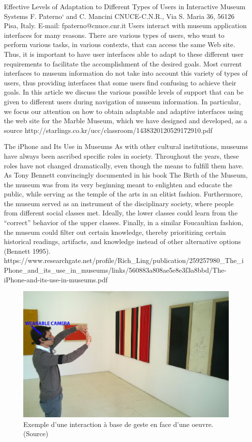 Effective Levels of Adaptation to Different Types
of Users in Interactive Museum Systems
F. Paterno` and C. Mancini
CNUCE-C.N.R., Via S. Maria 36, 56126 Pisa, Italy. E-mail: fpaterno@cnuce.cnr.it
Users interact with museum application interfaces for
many reasons. There are various types of users, who
want to perform various tasks, in various contexts, that
can access the same Web site. Thus, it is important to
have user interfaces able to adapt to these different user
requirements to facilitate the accomplishment of the
desired goals. Most current interfaces to museum information
do not take into account this variety of types of
users, thus providing interfaces that some users find
confusing to achieve their goals. In this article we discuss
the various possible levels of support that can be
given to different users during navigation of museum
information. In particular, we focus our attention on how
to obtain adaptable and adaptive interfaces using the
web site for the Marble Museum, which we have designed
and developed, as a source
http://starlings.co.kr/ucc/classroom/1438320120529172910.pdf



The iPhone and Its Use in Museums
As with other cultural institutions, museums have always
been ascribed specific roles in society. Throughout the years,
these roles have not changed dramatically, even though the
means to fulfill them have. As Tony Bennett convincingly
documented in his book The Birth of the Museum, the museum
was from its very beginning meant to enlighten and educate
the public, while serving as the temple of the arts in an elitist
fashion. Furthermore, the museum served as an instrument
of the disciplinary society, where people from different social
classes met. Ideally, the lower classes could learn from the
“correct” behavior of the upper classes. Finally, in a similar
Foucaultian fashion, the museum could filter out certain
knowledge, thereby prioritizing certain historical readings,
artifacts, and knowledge instead of other alternative options
(Bennett 1995).
https://www.researchgate.net/profile/Rich_Ling/publication/259257980_The_iPhone_and_its_use_in_museums/links/560883a808ae5e8e3f3a8bbd/The-iPhone-and-its-use-in-museums.pdf


\begin{figure}%
\includegraphics[width=\columnwidth]{figures/wearable.PNG}%
\caption{Exemple d'une interaction à base de geste en face d'une oeuvre. (Source)}%
\label{exempleGesteMusee}%
\end{figure}



